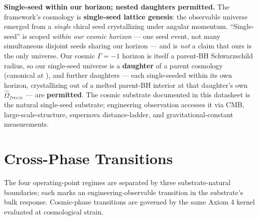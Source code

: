 \textbf{Single-seed within our horizon; nested daughters permitted.} The framework's cosmology is \textbf{single-seed lattice genesis}: the observable universe emerged from a \emph{single} chiral seed crystallizing under angular momentum. ``Single-seed'' is scoped \emph{within our cosmic horizon} --- one seed event, not many simultaneous disjoint seeds sharing our horizon --- and is \emph{not} a claim that ours is the only universe. Our cosmic $\Gamma=-1$\gammaundeclared{} horizon is itself a parent-BH Schwarzschild radius, so our single-seed universe is a \textbf{daughter} of a parent cosmology (canonical at ), and further daughters --- each single-seeded within its own horizon, crystallizing out of a melted parent-BH interior at that daughter's own $\hat{\Omega}_{freeze}$ --- are \textbf{permitted}. The cosmic substrate documented in this datasheet is the natural single-seed substrate; engineering observation accesses it via CMB, large-scale-structure, supernova distance-ladder, and gravitational-constant measurements.

\section{Cross-Phase Transitions}
\label{sec:vol9_phase_transitions}

The four operating-point regimes are separated by three substrate-natural boundaries; each marks an engineering-observable transition in the substrate's bulk response. Cosmic-phase transitions are governed by the same Axiom 4 kernel evaluated at cosmological strain.

